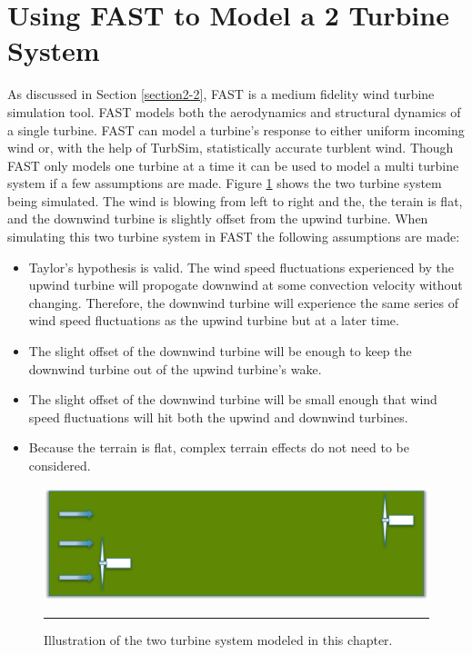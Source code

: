 
\section{Using FAST to Model a 2 Turbine System} \label{section3-2}

As discussed in Section \ref{section2-2}, FAST is a medium fidelity wind turbine simulation tool. FAST models both the aerodynamics and structural dynamics of a single turbine. FAST can model a turbine's response to either uniform incoming wind or, with the help of TurbSim, statistically accurate turblent wind. Though FAST only models one turbine at a time it can be used to model a multi turbine system if a few assumptions are made. Figure \ref{fig3-5} shows the two turbine system being simulated. The wind is blowing from left to right and the, the terain is flat, and the downwind turbine is slightly offset from the upwind turbine. When simulating this two turbine system in FAST the following assumptions are made:

\begin{itemize}
  \item Taylor's hypothesis is valid. The wind speed fluctuations experienced by the upwind turbine will propogate downwind at some convection velocity without changing. Therefore, the downwind turbine will experience the same series of wind speed fluctuations as the upwind turbine but at a later time.
  \item The slight offset of the downwind turbine will be enough to keep the downwind turbine out of the upwind turbine's wake.
  \item The slight offset of the downwind turbine will be small enough that wind speed fluctuations will hit both the upwind and downwind turbines.
  \item Because the terrain is flat, complex terrain effects do not need to be considered.
\end{itemize}


 \begin{figure}[htbp]
	\centering
		\includegraphics[width=\linewidth]{Figures/ch3Figures/fig3-5.png}
		\rule{35em}{0.5pt}
	\caption{Illustration of the two turbine system modeled in this chapter.}
	\label{fig3-5}
\end{figure}

